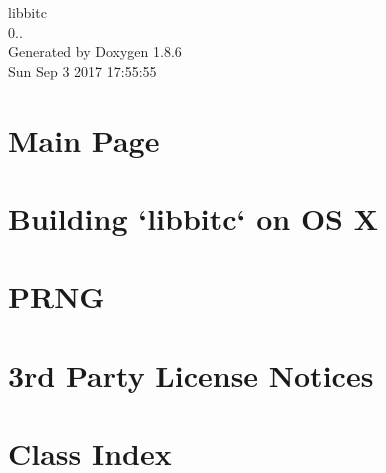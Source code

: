 \documentclass[twoside]{book}
\newcommand{\clearemptydoublepage}{%
  \newpage{\pagestyle{empty}\cleardoublepage}%
}
\begin{document}
\hypersetup{pageanchor=false}
\begin{titlepage}
\vspace*{7cm}
\begin{center}%
{\Large libbitc \\[1ex]\large 0.. }\\
\vspace*{1cm}
{\large Generated by Doxygen 1.8.6}\\
\vspace*{0.5cm}
{\small Sun Sep 3 2017 17:55:55}\\
\end{center}
\end{titlepage}
\clearemptydoublepage
\tableofcontents
\clearemptydoublepage
{}
\hypersetup{pageanchor=true}

\chapter{Main Page}
\label{index}\hypertarget{index}{}
\chapter{Building `libbitc` on O\-S X}
\label{md__home_ubuntu_workspace_doc_build-osx}
\hypertarget{md__home_ubuntu_workspace_doc_build-osx}{}

\chapter{P\-R\-N\-G}
\label{md__home_ubuntu_workspace_doc_PRNG}
\hypertarget{md__home_ubuntu_workspace_doc_PRNG}{}

\chapter{3rd Party License Notices}
\label{md__home_ubuntu_workspace_LICENSE-3RD-PARTY}
\hypertarget{md__home_ubuntu_workspace_LICENSE-3RD-PARTY}{}

\chapter{Class Index}

\end{document}
